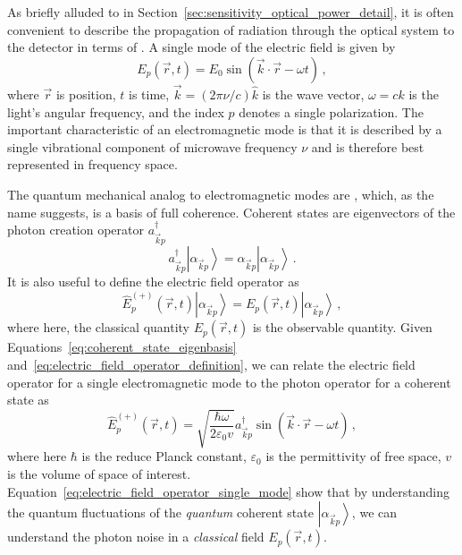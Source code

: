 As briefly alluded to in Section~\ref{sec:sensitivity_optical_power_detail}, it is often convenient to describe the propagation of radiation through the optical system to the detector in terms of . A single mode of the electric field is given by
\begin{equation}
    E_{p}(\vec{r}, t) = E_{0} \sin \left( \vec{k} \cdot \vec{r} - \omega t \right) \, ,
    \label{eq:electromagnetic_mode}
\end{equation}
where $\vec{r}$ is position, $t$ is time, $\vec{k} = (2 \pi \nu / c) \hat{k}$ is the wave vector, $\omega = c k$ is the light's angular frequency, and the index $p$ denotes a single polarization. The important characteristic of an electromagnetic mode is that it is described by a single vibrational component of microwave frequency $\nu$ and is therefore best represented in frequency space.

The quantum mechanical analog to electromagnetic modes are , which, as the name suggests, is a basis of full coherence. Coherent states are eigenvectors of the photon creation operator $a^{\dagger}_{\vec{k} p}$
\begin{equation}
    a^{\dagger}_{\vec{k} p} \left| \alpha_{\vec{k} p} \right> = \alpha_{\vec{k} p} \left| \alpha_{\vec{k} p} \right> \, .
    \label{eq:coherent_state_eigenbasis}
\end{equation}
It is also useful to define the electric field operator as
\begin{equation}
    \hat{E}_{p}^{(+)}(\vec{r}, t) \left| \alpha_{\vec{k} p} \right> = E_{p}(\vec{r}, t) \left| \alpha_{\vec{k} p} \right> \, ,
    \label{eq:electric_field_operator_definition}
\end{equation}
where here, the classical quantity $E_{p}(\vec{r}, t)$ is the observable quantity. Given Equations~\ref{eq:coherent_state_eigenbasis} and~\ref{eq:electric_field_operator_definition}, we can relate the electric field operator for a single electromagnetic mode to the photon operator for a coherent state as
\begin{equation}
    \hat{E}_{p}^{(+)}(\vec{r}, t) = \sqrt{\frac{\hbar \omega}{2 \varepsilon_{0} v}} a_{\vec{k} p}^{\dagger} \sin(\vec{k} \cdot \vec{r} - \omega t) \, ,
    \label{eq:electric_field_operator_single_mode}
\end{equation}
where here $\hbar$ is the reduce Planck constant, $\varepsilon_{0}$ is the permittivity of free space, $v$ is the volume of space of interest. Equation~\ref{eq:electric_field_operator_single_mode} show that by understanding the quantum fluctuations of the \textit{quantum} coherent state $\left| \alpha_{\vec{k} p} \right>$, we can understand the photon noise in a \textit{classical} field $E_{p}(\vec{r}, t)$.

